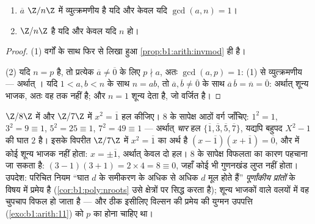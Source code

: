 \begin{theorem}[$\Z/n\Z$ की इकाइयाँ; क्षेत्र $\Z/p\Z$]\label{thm:b1:structures:zp}
\begin{enumerate}
  \item $\overline a$ $\Z/n\Z$ में व्युत्क्रमणीय है यदि और केवल यदि $\gcd(a,
  n) = 1$।
  \item $\Z/n\Z$  है यदि और केवल यदि $n$  हो।
\end{enumerate}
\end{theorem}

\begin{proof}
(1) वर्गों के साथ फिर से लिखा हुआ \cref{prop:b1:arith:invmod} ही है।

(2) यदि $n = p$  है, तो प्रत्येक $\overline a \neq \overline 0$ के लिए
$p \nmid a$, अतः $\gcd(a, p) = 1$: (1) से व्युत्क्रमणीय --- अर्थात् ।
यदि $1 < a, b < n$ के साथ $n = ab$, तो $\overline a, \overline b \neq
\overline 0$ के साथ $\overline a\, \overline b = \overline n = \overline 0$:
अर्थात् शून्य भाजक, अतः वह  तक नहीं है; और $n = 1$ शून्य
 देता है, जो वर्जित है।
\end{proof}

\begin{example}[$1$ के कितने वर्गमूल?]\label{ex:b1:structures:sqrtone}
$\Z/8\Z$ में और $\Z/7\Z$ में $x^2 = \overline 1$ हल कीजिए। $8$ के सापेक्ष
आठों वर्ग जाँचिए: $1^2 = 1$, $3^2 = 9 \equiv 1$, $5^2 = 25 \equiv 1$, $7^2 =
49 \equiv 1$ --- अर्थात् \emph{चार} हल $\{\overline1, \overline3,
\overline5, \overline7\}$, यद्यपि बहुपद $X^2 - 1$ की घात $2$ है। इसके विपरीत
 $\Z/7\Z$ में $x^2 = \overline1$ का अर्थ है $(x - \overline1)(x +
\overline1) = \overline0$, और  में कोई शून्य भाजक नहीं होता: $x =
\pm\overline1$, अर्थात् केवल दो हल। $8$ के सापेक्ष विफलता का कारण पहचाना जा
सकता है: $(3-1)(3+1) = 2 \times 4 = 8 \equiv 0$, जहाँ कोई भी गुणनखंड लुप्त
नहीं होता। उपदेश: परिचित नियम ``घात $d$ के समीकरण के अधिक से अधिक $d$ मूल
होते हैं'' \emph{पूर्णांकीय प्रांतों} के विषय में प्रमेय है
(\cref{cor:b1:poly:nroots} उसे क्षेत्रों पर सिद्ध करता है); शून्य भाजकों
वाले वलयों में वह चुपचाप विफल हो जाता है --- और ठीक इसीलिए विल्सन की प्रमेय
की युग्मन उपपत्ति (\cref{exo:b1:arith:11}) को $p$ का  होना चाहिए था।
\end{example}

